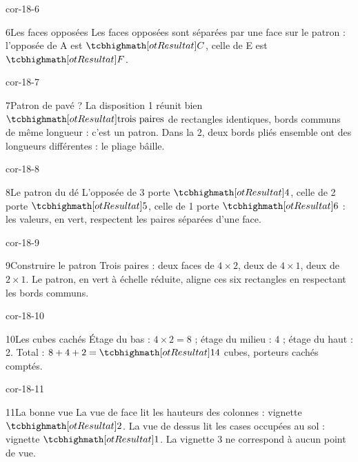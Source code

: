 \begin{blocLivre}{cor-18-6}\begin{corrige}{6}{Les faces opposées}
Les faces opposées sont séparées par une face sur le patron : l’opposée de A est $\res C$, celle de E est $\res F$.
\label{fig-cor-18-6}
\end{corrige}\end{blocLivre}
\begin{blocLivre}{cor-18-7}\begin{corrige}{7}{Patron de pavé ?}
La disposition 1 réunit bien $\res{\text{trois paires}}$ de rectangles identiques, bords communs de même longueur : c’est un patron. Dans la 2, deux bords pliés ensemble ont des longueurs différentes : le pliage bâille.
\label{fig-cor-18-7}
\end{corrige}\end{blocLivre}
\begin{blocLivre}{cor-18-8}\begin{corrige}{8}{Le patron du dé}
L’opposée de 3 porte $\res4$, celle de 2 porte $\res5$, celle de 1 porte $\res6$ : les valeurs, en vert, respectent les paires séparées d’une face.
\label{fig-cor-18-8}
\end{corrige}\end{blocLivre}
\begin{blocLivre}{cor-18-9}\begin{corrige}{9}{Construire le patron}
Trois paires : deux faces de $4\times2$, deux de $4\times1$, deux de $2\times1$. Le patron, en vert à échelle réduite, aligne ces six rectangles en respectant les bords communs.
\label{fig-cor-18-9}
\end{corrige}\end{blocLivre}
\begin{blocLivre}{cor-18-10}\begin{corrige}{10}{Les cubes cachés}
Étage du bas : $4\times2=8$ ; étage du milieu : 4 ; étage du haut : 2. Total : $8+4+2=\res{14}$ cubes, porteurs cachés comptés.
\label{fig-cor-18-10}
\end{corrige}\end{blocLivre}
\begin{blocLivre}{cor-18-11}\begin{corrige}{11}{La bonne vue}
La vue de face lit les hauteurs des colonnes : vignette $\res2$. La vue de dessus lit les cases occupées au sol : vignette $\res1$. La vignette 3 ne correspond à aucun point de vue.
\label{fig-cor-18-11}
\end{corrige}\end{blocLivre}
